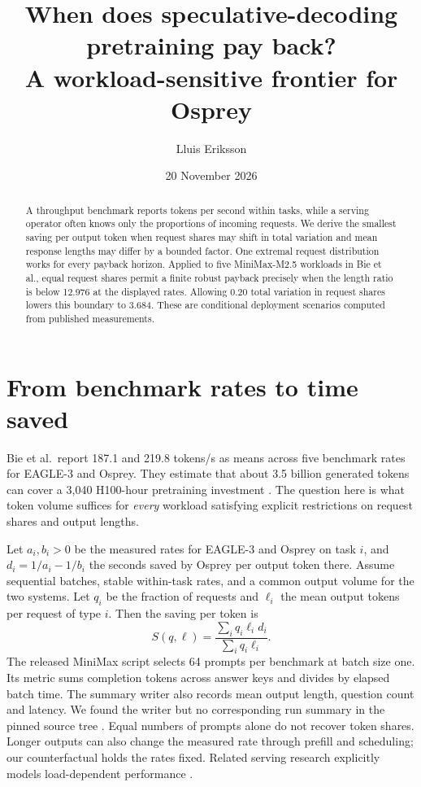 \documentclass[11pt]{article}
\title{When does speculative-decoding pretraining pay back?\\A workload-sensitive frontier for Osprey}
\author{Lluis Eriksson}
\date{20 November 2026}
\begin{document}
\maketitle
\begin{abstract}
A throughput benchmark reports tokens per second within tasks, while a serving operator often knows only the proportions of incoming requests. We derive the smallest saving per output token when request shares may shift in total variation and mean response lengths may differ by a bounded factor. One extremal request distribution works for every payback horizon. Applied to five MiniMax-M2.5 workloads in Bie et al., equal request shares permit a finite robust payback precisely when the length ratio is below 12.976 at the displayed rates. Allowing 0.20 total variation in request shares lowers this boundary to 3.684. These are conditional deployment scenarios computed from published measurements.
\end{abstract}
\section{From benchmark rates to time saved}
Bie et al.\ report 187.1 and 219.8 tokens/s as means across five benchmark rates for EAGLE-3 and Osprey. They estimate that about 3.5 billion generated tokens can cover a 3,040 H100-hour pretraining investment \cite{osprey}. The question here is what token volume suffices for \emph{every} workload satisfying explicit restrictions on request shares and output lengths.

Let $a_i,b_i>0$ be the measured rates for EAGLE-3 and Osprey on task $i$, and $d_i=1/a_i-1/b_i$ the seconds saved by Osprey per output token there. Assume sequential batches, stable within-task rates, and a common output volume for the two systems. Let $q_i$ be the fraction of requests and $\ell_i$ the mean output tokens per request of type $i$. Then the saving per token is
\[
  S(q,\ell)=\frac{\sum_i q_i\ell_i d_i}{\sum_i q_i\ell_i}.
\]
The released MiniMax script selects 64 prompts per benchmark at batch size one. Its metric sums completion tokens across answer keys and divides by elapsed batch time. The summary writer also records mean output length, question count and latency. We found the writer but no corresponding run summary in the pinned source tree \cite{code}. Equal numbers of prompts alone do not recover token shares. Longer outputs can also change the measured rate through prefill and scheduling; our counterfactual holds the rates fixed. Related serving research explicitly models load-dependent performance \cite{goodput}.
\end{document}
